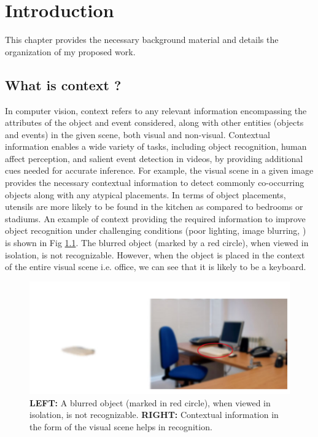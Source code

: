 \chapter{Introduction}
\label{cha:introduction}
This chapter provides the necessary background material and details the organization of my proposed work.
\section{What is context ?}
In computer vision, context \cite{contextvision} refers to any relevant information encompassing the attributes of the object and event considered, along with other entities (objects and events) in the given scene, both visual and non-visual. Contextual information enables a wide variety of tasks, including object recognition, human affect perception, and salient event detection in videos, by providing additional cues needed for accurate inference. For example, the visual scene in a given image provides the necessary contextual information to detect commonly co-occurring objects along with any atypical placements. In terms of object placements, utensils are more likely to be found in the kitchen as compared to bedrooms or stadiums. An example of context providing the required information to improve object recognition under challenging conditions (poor lighting, image blurring, ) is shown in Fig \ref{object recognition}. The blurred object (marked by a red circle), when viewed in isolation, is not recognizable. However, when the object is placed in the context of the entire visual scene i.e. office, we can see that it is likely to be a keyboard.
\begin{figure}
    \centering 
     \includegraphics[width=0.6\linewidth]{figures/blurred_object.png}
     \caption{ \textbf{LEFT:} A blurred object (marked in red circle), when viewed in isolation, is not recognizable. \textbf{RIGHT:} Contextual information in the form of the visual scene helps in recognition. }
     \label{object recognition}
\end{figure}

